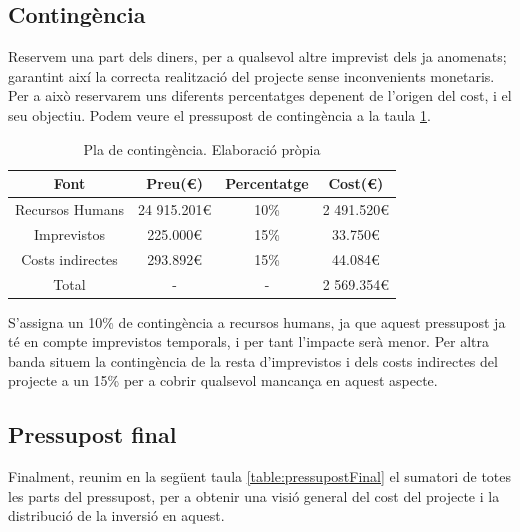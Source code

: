 \documentclass[a4paper]{report}
\begin{document}
	
	\subsection{Contingència}
	Reservem una part dels diners, per a qualsevol altre imprevist dels ja anomenats; garantint així la correcta realització del projecte sense inconvenients monetaris. Per a això reservarem uns diferents percentatges depenent de l'origen del cost, i el seu objectiu. Podem veure el pressupost de contingència a la taula \ref{table:contingencia}.
	
	\begin{table}
		\centering
		\begin{tabular}{|| c || c | c | c |}
			\hline
			\textbf{Font} & \textbf{Preu(\euro)} & \textbf{Percentatge} & \textbf{Cost(\euro)} \\
			\hline \hline
			Recursos Humans & 24 915.201\euro & 10\% & 2 491.520\euro \\
			\hline
			Imprevistos & 225.000\euro & 15\% & 33.750\euro \\
			\hline
			Costs indirectes & 293.892\euro & 15\% & 44.084\euro \\
			\hline \hline
			Total & - & - & 2 569.354\euro \\
			\hline
		\end{tabular}
		\caption[Pla de contingència]{Pla de contingència. Elaboració pròpia}
		\label{table:contingencia}
	\end{table}

	S'assigna un 10\% de contingència a recursos humans, ja que aquest pressupost ja té en compte imprevistos temporals, i per tant l'impacte serà menor. Per altra banda situem la contingència de la resta d'imprevistos i dels costs indirectes del projecte a un 15\% per a cobrir qualsevol mancança en aquest aspecte.
	
	\subsection{Pressupost final}
	Finalment, reunim en la següent taula \ref{table:pressupostFinal} el sumatori de totes les parts del pressupost, per a obtenir una visió general del cost del projecte i la distribució de la inversió en aquest.
	
\end{document}
